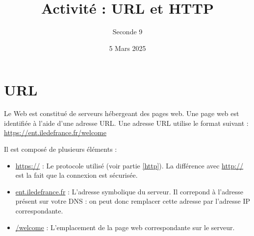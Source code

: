 \documentclass{article}
\title{Activité : URL et HTTP}
\author{Seconde 9}
\date{5 Mars 2025}
\begin{document}
\maketitle

\section{URL}
\begin{tcolorbox}
Le Web est constitué de serveurs hébergeant des pages web. Une page web est identifiée à l'aide d'une adresse URL. Une adresse URL utilise le format suivant :
\url{https://ent.iledefrance.fr/welcome}

Il est composé de plusieurs éléments :
\begin{itemize}
\item \url{https://} : Le protocole utilisé (voir partie \ref{http}). La différence avec \url{http://} est la fait que la connexion est sécurisée.
\item \url{ent.iledefrance.fr} : L'adresse symbolique du serveur. Il correpond à l'adresse présent sur votre DNS : on peut donc remplacer cette adresse par l'adresse IP correspondante.
\item \url{/welcome} : L'emplacement de la page web correspondante sur le serveur.  
\end{itemize}
\end{tcolorbox}
\end{document}
